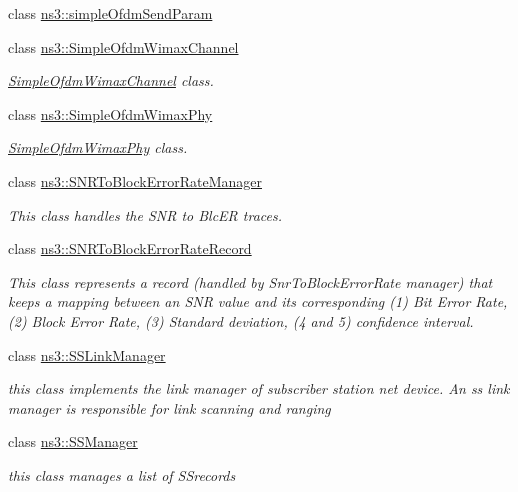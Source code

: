 \begin{DoxyCompactItemize}
\item 
class \hyperlink{classns3_1_1simpleOfdmSendParam}{ns3\+::simple\+Ofdm\+Send\+Param}
\item 
class \hyperlink{classns3_1_1SimpleOfdmWimaxChannel}{ns3\+::\+Simple\+Ofdm\+Wimax\+Channel}
\begin{DoxyCompactList}\small\item\em \hyperlink{classns3_1_1SimpleOfdmWimaxChannel}{Simple\+Ofdm\+Wimax\+Channel} class. \end{DoxyCompactList}\item 
class \hyperlink{classns3_1_1SimpleOfdmWimaxPhy}{ns3\+::\+Simple\+Ofdm\+Wimax\+Phy}
\begin{DoxyCompactList}\small\item\em \hyperlink{classns3_1_1SimpleOfdmWimaxPhy}{Simple\+Ofdm\+Wimax\+Phy} class. \end{DoxyCompactList}\item 
class \hyperlink{classns3_1_1SNRToBlockErrorRateManager}{ns3\+::\+S\+N\+R\+To\+Block\+Error\+Rate\+Manager}
\begin{DoxyCompactList}\small\item\em This class handles the S\+NR to Blc\+ER traces. \end{DoxyCompactList}\item 
class \hyperlink{classns3_1_1SNRToBlockErrorRateRecord}{ns3\+::\+S\+N\+R\+To\+Block\+Error\+Rate\+Record}
\begin{DoxyCompactList}\small\item\em This class represents a record (handled by Snr\+To\+Block\+Error\+Rate manager) that keeps a mapping between an S\+NR value and its corresponding (1) Bit Error Rate, (2) Block Error Rate, (3) Standard deviation, (4 and 5) confidence interval. \end{DoxyCompactList}\item 
class \hyperlink{classns3_1_1SSLinkManager}{ns3\+::\+S\+S\+Link\+Manager}
\begin{DoxyCompactList}\small\item\em this class implements the link manager of subscriber station net device. An ss link manager is responsible for link scanning and ranging \end{DoxyCompactList}\item 
class \hyperlink{classns3_1_1SSManager}{ns3\+::\+S\+S\+Manager}
\begin{DoxyCompactList}\small\item\em this class manages a list of S\+Srecords \end{DoxyCompactList}\item 

\end{DoxyCompactItemize}
